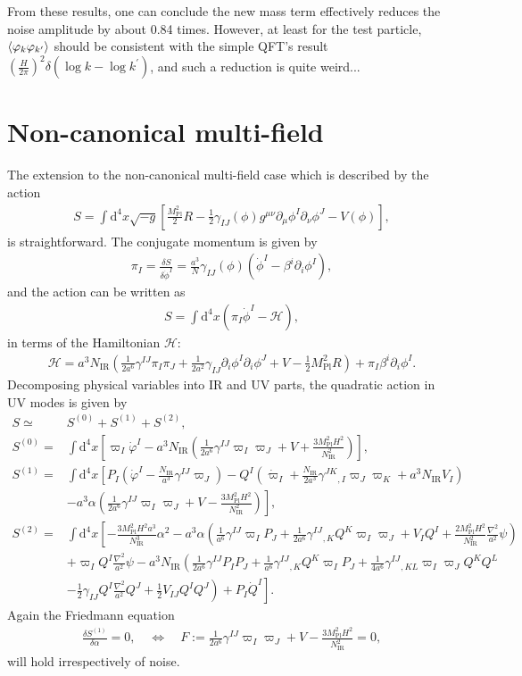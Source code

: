 \documentclass[aps, prd
, preprint
, nofootinbib 
]{revtex4-1}
\newcommand{\var}[2]{\frac{\delta #1}{\delta #2}}
\newcommand{\dd}{\mathrm{d}}
\newcommand{\Mpl}{M_\text{Pl}}
\newcommand{\IR}{\text{IR}}
\newcommand{\bae}[1]{\begin{align} #1 \end{align}}
\begin{document}
From these results, one can conclude the new mass term effectively reduces the noise amplitude by about 0.84 times.
However, at least for the test particle, $\braket{\varphi_k\varphi_{k^\prime}}$ should be consistent with the simple QFT's result 
$\left(\frac{H}{2\pi}\right)^2\delta(\log k-\log k^\prime)$, and such a reduction is quite weird...






\section{Non-canonical multi-field}

The extension to the non-canonical multi-field case which is described by the action
\bae{
	S=\int\dd^4x\sqrt{-g}\left[\frac{\Mpl^2}{2}R-\frac{1}{2}\gamma_{IJ}(\phi)g^{\mu\nu}\partial_\mu\phi^I\partial_\nu\phi^J-V(\phi)\right],
}
is straightforward. The conjugate momentum is given by
\bae{
	\pi_I=\var{S}{\dot{\phi}^I}=\frac{a^3}{N}\gamma_{IJ}(\phi)(\dot{\phi}^I-\beta^i\partial_i\phi^I),
}
and the action can be written as
\bae{
	S=\int\dd^4x(\pi_I\dot{\phi}^I-\mathcal{H}),
}
in terms of the Hamiltonian $\mathcal{H}$:
\bae{
	\mathcal{H}=a^3N_\IR\left(\frac{1}{2a^6}\gamma^{IJ}\pi_I\pi_J+\frac{1}{2a^2}\gamma_{IJ}\partial_i\phi^I\partial_i\phi^J+V
	-\frac{1}{2}\Mpl^2R\right)+\pi_I\beta^i\partial_i\phi^I.
}
Decomposing physical variables into IR and UV parts, the quadratic action in UV modes is given by
\bae{
	S\simeq&S^{(0)}+S^{(1)}+S^{(2)}, \nonumber \\
	S^{(0)}=&\int\dd^4x\left[\varpi_I\dot{\varphi}^I-a^3N_\IR\left(\frac{1}{2a^6}\gamma^{IJ}\varpi_I\varpi_J+V+\frac{3\Mpl^2H^2}{N_\IR^2}\right)\right], \\
	S^{(1)}=&\int\dd^4x\left[P_I\left(\dot{\varphi}^I-\frac{N_\IR}{a^3}\gamma^{IJ}\varpi_J\right)
	-Q^I\left(\dot{\varpi}_I+\frac{N_\IR}{2a^3}\gamma^{JK}{}_{,I}\varpi_J\varpi_K+a^3N_\IR V_I\right) \right. \nonumber \\
	&\left.-a^3\alpha\left(\frac{1}{2a^6}\gamma^{IJ}\varpi_I\varpi_J+V-\frac{3\Mpl^2H^2}{N_\IR^2}\right)\right], \\
	S^{(2)}=&\int\dd^4x\left[-\frac{3\Mpl^2H^2a^3}{N_\IR^3}\alpha^2-a^3\alpha\left(\frac{1}{a^6}\gamma^{IJ}\varpi_IP_J
	+\frac{1}{2a^6}\gamma^{IJ}{}_{,K}Q^K\varpi_I\varpi_J+V_IQ^I+\frac{2\Mpl^2H^2}{N_\IR^2}\frac{\nabla^2}{a^2}\psi\right) \right.\nonumber \\
	&+\varpi_IQ^I\frac{\nabla^2}{a^2}\psi-a^3N_\IR\left(\frac{1}{2a^6}\gamma^{IJ}P_IP_J+\frac{1}{a^6}\gamma^{IJ}{}_{,K}Q^K\varpi_IP_J
	+\frac{1}{4a^6}\gamma^{IJ}{}_{,KL}\varpi_I\varpi_JQ^KQ^L \right. \nonumber \\
	& \left.\left.-\frac{1}{2}\gamma_{IJ}Q^I\frac{\nabla^2}{a^2}Q^J
	+\frac{1}{2}V_{IJ}Q^IQ^J\right)
	+P_I\dot{Q}^I\right].
}
Again the Friedmann equation
\bae{
	\var{S^{(1)}}{\alpha}=0, \quad \Leftrightarrow \quad F:=\frac{1}{2a^6}\gamma^{IJ}\varpi_I\varpi_J+V-\frac{3\Mpl^2H^2}{N_\IR^2}=0,
}
will hold irrespectively of noise.
\end{document}
